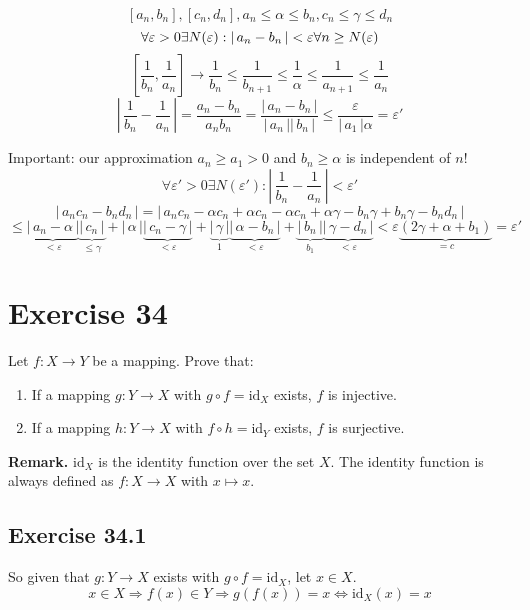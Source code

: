 \documentclass[a4paper]{article}
\theoremstyle{definition}
\newcommand\abs[1]{\left|\thinspace #1\thinspace\right|}
\newcommand\card[1]{\left|\,#1\,\right|}
\begin{document}
\[ [a_n, b_n], [c_n, d_n], a_n \leq \alpha \leq b_n, c_n \leq \gamma \leq d_n \]
\[ \forall \varepsilon > 0 \exists N(\varepsilon): \abs{a_n - b_n} < \varepsilon \forall n \geq N(\varepsilon) \]
\[
    \left[\frac{1}{b_n}, \frac{1}{a_n}\right] \rightarrow \frac{1}{b_n} \leq \frac{1}{b_{n+1}} \leq \frac{1}{\alpha} \leq \frac{1}{a_{n+1}} \leq \frac{1}{a_n}
\] \[
  \card{\frac{1}{b_n} - \frac{1}{a_n}}
  = \frac{a_n - b_n}{a_n b_n}
  = \frac{\card{a_n - b_n}}{\card{a_n}\card{b_n}} \leq \frac{\varepsilon}{\card{a_1} \alpha}
  = \varepsilon'
\]

Important: our approximation $a_n \geq a_1 > 0$ and $b_n \geq \alpha$ is independent of $n$!
\[
  \forall \varepsilon' > 0 \exists N(\varepsilon'): \card{\frac1{b_n} - \frac1{a_n}} < \varepsilon'
\] \[
  \card{a_n c_n - b_n d_n} = \card{a_n c_n - \alpha c_n + \alpha c_n - \alpha c_n + \alpha \gamma - b_n \gamma + b_n \gamma - b_n d_n}
\] \[
  \leq \underbrace{\card{a_n - \alpha}}_{<\varepsilon} \underbrace{\card{c_n}}_{\leq \gamma} + \card{\alpha} \underbrace{\card{c_n - \gamma}}_{<\varepsilon} + \underbrace{\card{\gamma}}_{1} \underbrace{\card{\alpha - b_n}}_{<\varepsilon} + \underbrace{\card{b_n}}_{b_1} \underbrace{\card{\gamma - d_n}}_{<\varepsilon} < \varepsilon\underbrace{(2\gamma + \alpha + b_1)}_{=c} = \varepsilon'
\]

\section{Exercise 34}

\begin{ex}
  Let $f: X \rightarrow Y$ be a mapping. Prove that:
  \begin{enumerate}
    \item If a mapping $g: Y \rightarrow X$ with $g \circ f = \text{id}_X$ exists, $f$ is injective.
    \item If a mapping $h: Y \rightarrow X$ with $f \circ h = \text{id}_Y$ exists, $f$ is surjective.
  \end{enumerate}
  \textbf{Remark.} $\text{id}_X$ is the identity function over the set $X$.
    The identity function is always defined as $f: X \rightarrow X$ with $x \mapsto x$.
\end{ex}

\subsection{Exercise 34.1}
%
So given that $g: Y \rightarrow X$ exists with $g \circ f = \text{id}_X$,
let $x \in X$.
\[ x \in X \Rightarrow f(x) \in Y \Rightarrow g(f(x)) = x \Leftrightarrow \text{id}_X(x) = x \]
\end{document}
